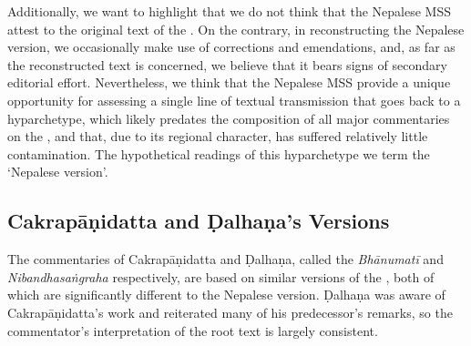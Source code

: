 Additionally, we want to highlight that we do not think that the Nepalese MSS attest to the original text of the \SS. On the contrary, in reconstructing the Nepalese version, we occasionally make use of corrections and emendations, and, as far as the reconstructed text is concerned, we believe that it bears signs of secondary editorial effort.
Nevertheless, we think that the Nepalese MSS provide a unique opportunity for assessing a single line of textual transmission that goes back to a hyparchetype, which likely predates the composition of all major commentaries on the \SS, and that, due to its regional character, has suffered relatively little contamination. The hypothetical readings of this hyparchetype we term the `Nepalese version'. 


\subsection{Cakrapāṇidatta and Ḍalhaṇa's Versions}
The commentaries of Cakrapāṇidatta and Ḍalhaṇa, called the \emph{Bhānumatī} and \emph{Nibandhasaṅgraha} respectively, are based on similar versions of the \SS, both of which are significantly different to the Nepalese version. Ḍalhaṇa was aware of Cakrapāṇidatta's work and reiterated many of his predecessor's remarks, so the commentator's interpretation of the root text is largely consistent. 

